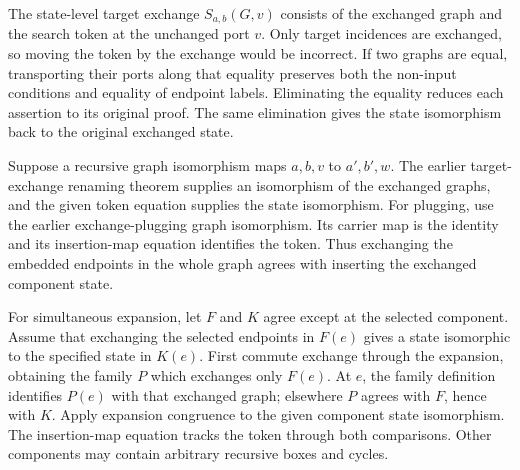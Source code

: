 
The state-level target exchange $S_{a,b}(G,v)$ consists of the exchanged
graph and the search token at the unchanged port $v$. Only target incidences
are exchanged, so moving the token by the exchange would be incorrect.
If two graphs are equal, transporting their ports along that equality
preserves both the non-input conditions and equality of endpoint labels.
Eliminating the equality reduces each assertion to its original proof.
The same elimination gives the state isomorphism back to the original
exchanged state.





Suppose a recursive graph isomorphism maps $a,b,v$ to $a',b',w$.
The earlier target-exchange renaming theorem supplies an isomorphism of
the exchanged graphs, and the given token equation supplies the state
isomorphism. For plugging, use the earlier exchange-plugging graph isomorphism.
Its carrier map is the identity and its insertion-map equation identifies
the token. Thus exchanging the embedded endpoints in the whole graph agrees
with inserting the exchanged component state.



For simultaneous expansion, let $F$ and $K$ agree except at the selected
component. Assume that exchanging the selected endpoints in $F(e)$ gives
a state isomorphic to the specified state in $K(e)$. First commute exchange
through the expansion, obtaining the family $P$ which exchanges only $F(e)$.
At $e$, the family definition identifies $P(e)$ with that exchanged graph;
elsewhere $P$ agrees with $F$, hence with $K$. Apply expansion congruence to
the given component state isomorphism. The insertion-map equation tracks the
token through both comparisons. Other components may contain arbitrary
recursive boxes and cycles.


